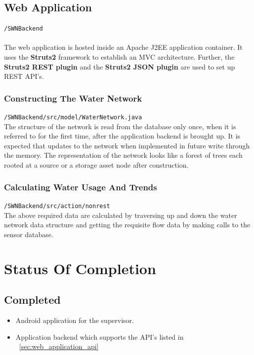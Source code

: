 \documentclass[11pt]{report} %
\begin{document}
\section{Web Application}
\texttt{/SWNBackend} \\
\\
The web application is hosted inside an Apache J2EE application container. It uses the \textbf{ Struts2} framework to establish an MVC architecture. Further, the \textbf{Struts2 REST plugin} and the \textbf{Struts2 JSON plugin} are used to set up REST API's.
\\
\noindent

\subsection{Constructing The Water Network}
\texttt{/SWNBackend/src/model/WaterNetwork.java}
\\
\noindent The structure of the network is read from the database only once, when it is referred to for the first time, after the application backend is brought up. It is expected that updates to the network when implemented in future write through the memory.
\noindent The representation of the network looks like a forest of trees each rooted at a source or a storage asset node after construction.

\subsection{Calculating Water Usage And Trends}
\texttt{/SWNBackend/src/action/nonrest}
\\
\noindent The above required data are calculated by traversing up and down the water network data structure and getting the requisite flow data by making calls to the sensor database.


\chapter{Status Of Completion}
\section{Completed}
\begin{itemize}
\item Android application for the supervisor.
\item Application backend which supports the API's listed in ~\ref{sec:web_application_api}
\end{itemize}
\end{document}
